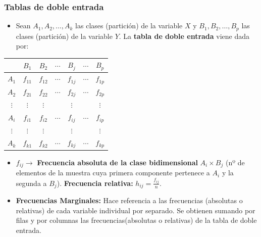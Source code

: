 \subsubsection{Tablas de doble entrada}
\begin{itemize}
	\item Sean $A_1, A_2, \hdots, A_k$ las clases (partición) de la variable $X$ y $B_1, B_2, \hdots, B_p$ las clases (partición) de la variable $Y$. La \textbf{tabla de doble entrada} viene dada por:
\end{itemize}
\begin{center}
	\begin{tabular}{|c||c|c|c|c|c|c|}
		\hline
		\backslashbox{X}{Y} & $B_1$    & $B_2$    & $\cdots$ & $B_j$    & $\cdots$ & $B_{p}$  \\
		\hline
		\hline
		$A_1$               & $f_{11}$ & $f_{12}$ & $\cdots$ & $f_{1j}$ & $\cdots$ & $f_{1p}$ \\ \hline
		$A_2$               & $f_{21}$ & $f_{22}$ & $\cdots$ & $f_{2j}$ & $\cdots$ & $f_{2p}$ \\ \hline
		$\vdots$            & $\vdots$ & $\vdots$ &          & $\vdots$ &          & $\vdots$ \\ \hline
		$A_i$               & $f_{i1}$ & $f_{i2}$ & $\cdots$ & $f_{ij}$ & $\cdots$ & $f_{ip}$ \\ \hline
		$\vdots$            & $\vdots$ & $\vdots$ &          & $\vdots$ &          & $\vdots$ \\ \hline
		$A_k$               & $f_{k1}$ & $f_{k2}$ & $\cdots$ & $f_{kj}$ & $\cdots$ & $f_{kp}$ \\ \hline
	\end{tabular}
\end{center}
\begin{itemize}
	\item $f_{ij} \longrightarrow$ \textbf{Frecuencia absoluta de la clase bidimensional} $A_{i}\times B_{j}$ (nº de elementos de la muestra cuya primera componente pertenece a $A_{i}$ y la segunda a $B_{j}$). \textbf{Frecuencia relativa:} $h_{ij}=\displaystyle \frac{f_{ij}}{n}$.
	\item \textbf{Frecuencias Marginales:} Hace referencia a las frecuencias (absolutas o relativas) de cada variable individual por separado. Se obtienen sumando por filas y por columnas las frecuencias(absolutas o relativas) de la tabla de doble entrada.
\end{itemize}
